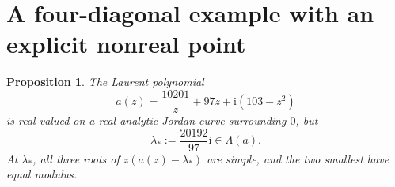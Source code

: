 \documentclass[11pt,a4paper]{amsart}
\newtheorem{proposition}[theorem]{Proposition}
\theoremstyle{remark}
\newtheorem{remark}[theorem]{Remark}
\numberwithin{equation}{section}
\newcommand{\ii}{\mathrm i}
\begin{document}

\section{A four-diagonal example with an explicit nonreal point}
\label{sec:complex}

\begin{proposition}
\label{prop:complex}
The Laurent polynomial
\[
 a(z)=\frac{10201}{z}+97z+\ii(103-z^2)
\]
is real-valued on a real-analytic Jordan curve surrounding \(0\), but
\[
 \lambda_*:=\frac{20192}{97}\ii\in\Lambda(a).
\]
At \(\lambda_*\), all three roots of \(z(a(z)-\lambda_*)\) are simple, and the two smallest have equal modulus.
\end{proposition}
\end{document}
